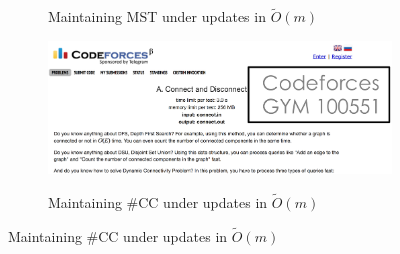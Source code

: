 \documentclass[12pt]{beamer}
\begin{document}
\begin{spacing}{1.3}
{\begin{figure}
{\begin{subfigure}[H]{0.58\textwidth}
			\label{exp1}
			\caption{Maintaining MST under updates in \scriptsize$\widetilde{O}(m)$}
		\end{subfigure}
		\begin{subfigure}[H]{0.58\textwidth}
			\vspace{14pt}
			\includegraphics[width=1\textwidth]{cf100551}
			\label{exp2}
			\caption{Maintaining \#CC under updates in \scriptsize$\widetilde{O}(m)$}
		\end{subfigure}
		}
	\end{figure}
}
	
\end{spacing}
\end{document}

